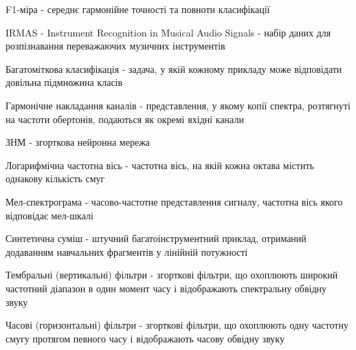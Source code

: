 
F1-міра - середнє гармонійне точності та повноти класифікації

IRMAS - Instrument Recognition in Musical Audio Signals - набір даних для розпізнавання переважаючих музичних інструментів

Багатоміткова класифікація - задача, у якій кожному прикладу може відповідати довільна підмножина класів

Гармонічне накладання каналів - представлення, у якому копії спектра, розтягнуті на частоти обертонів, подаються як окремі вхідні канали

ЗНМ - згорткова нейронна мережа

Логарифмічна частотна вісь - частотна вісь, на якій кожна октава містить однакову кількість смуг

Мел-спектрограма - часово-частотне представлення сигналу, частотна вісь якого відповідає мел-шкалі

Синтетична суміш - штучний багатоінструментний приклад, отриманий додаванням навчальних фрагментів у лінійній потужності

Тембральні (вертикальні) фільтри - згорткові фільтри, що охоплюють широкий частотний діапазон в один момент часу і відображають спектральну обвідну звуку

Часові (горизонтальні) фільтри - згорткові фільтри, що охоплюють одну частотну смугу протягом певного часу і відображають часову обвідну звуку
